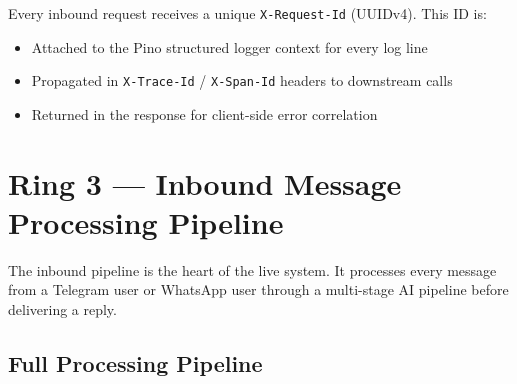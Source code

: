 \documentclass[12pt,a4paper]{article}
\begin{document}
Every inbound request receives a unique \texttt{X-Request-Id} (UUIDv4). This ID is:
\begin{itemize}[noitemsep]
  \item Attached to the Pino structured logger context for every log line
  \item Propagated in \texttt{X-Trace-Id} / \texttt{X-Span-Id} headers to downstream calls
  \item Returned in the response for client-side error correlation
\end{itemize}

\section{Ring 3 — Inbound Message Processing Pipeline}
\label{sec:inbound}

The inbound pipeline is the heart of the live system. It processes every message from
a Telegram user or WhatsApp user through a multi-stage AI pipeline before delivering
a reply.

\subsection{Full Processing Pipeline}
\end{document}
